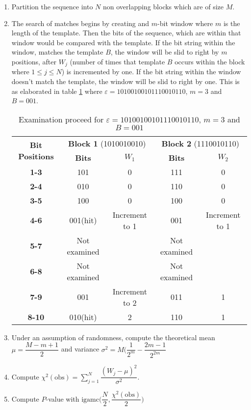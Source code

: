 \begin{enumerate}
    \item Partition the sequence into $N$ non overlapping blocks which are of size $M$.
    
    \item The search of matches begins by creating and $m$-bit window where $m$ is the length of the template. Then the bits of the sequence, which are within that window would be compared with the template. If the bit string within the window, matches the template $B$, the window will be slid to right by $m$ positions, after $W_j$ (number of times that template $B$ occurs within the block where $1 \leq j \leq N$) is incremented by one. If the bit string within the window doesn't match the template, the window will be slid to right by one. This is as elaborated in table \ref{tab:bit_wind_310} where $\varepsilon=10100100101110010110$, $m=3$ and $B=001$.
    
    \begin{table}[h!]
        \small
        \centering
            \begin{tabular}{|c|c|c|c|c|}
            \hline
            \multirow{2}{*}{\textbf{Bit Positions}} & \multicolumn{2}{c|}{\textbf{Block 1} (1010010010)} & \multicolumn{2}{c|}{\textbf{Block 2} (1110010110)} \\ \cline{2-5} 
             & \textbf{Bits} & \textbf{$W_1$} & \textbf{Bits} & \textbf{$W_2$} \\ \hline
            \textbf{1-3} & 101 & 0 & 111 & 0 \\ \hline
            \textbf{2-4} & 010 & 0 & 110 & 0 \\ \hline
            \textbf{3-5} & 100 & 0 & 100 & 0 \\ \hline
            \textbf{4-6} & 001(hit) & Increment to 1 & 001 & Increment to 1 \\ \hline
            \textbf{5-7} & Not examined &  & Not examined &  \\ \hline
            \textbf{6-8} & Not examined &  & Not examined &  \\ \hline
            \textbf{7-9} & 001 & Increment to 2 & 011 & 1 \\ \hline
            \textbf{8-10} & 010(hit) & 2 & 110 & 1 \\ \hline
        \end{tabular}
        \caption{Examination proceed for $\varepsilon=10100100101110010110$, $m=3$ and $B=001$}
        \label{tab:bit_wind_310}
    \end{table}
    
    \item Under an assumption of randomness, compute the theoretical mean $\mu = \dfrac{M-m+1}{2}$ and variance $\sigma^2 = M\bigg(\dfrac{1}{2^m}-\dfrac{2m-1}{2^{2m}}$
    
    \item Compute $\chi^2(\text{obs}) = \sum_{j=1}^{N}\dfrac{(W_j-\mu)^2}{\sigma^2}$.
    
    \item Compute $P$-value with $\text{igamc}\bigg(\dfrac{N}{2}, \dfrac{\chi^2(\text{obs})}{2}\bigg)$
\end{enumerate}

